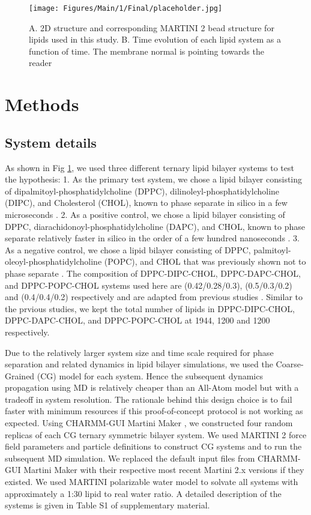 \documentclass{biophys-new}
\begin{document}
\begin{figure}[hbt!]
\centering
\texttt{[image: Figures/Main/1/Final/placeholder.jpg]}
\caption{A. 2D structure and corresponding MARTINI 2 bead structure for lipids used in this study. B. Time evolution of each lipid system as a function of time. The membrane normal is pointing towards the reader}
\label{fig1:view}
\end{figure}

\section*{Methods}

\subsection*{System details}

As shown in Fig \ref{fig1:view}, we used three different ternary lipid bilayer systems to test the hypothesis:
1. As the primary test system, we chose a lipid bilayer consisting of dipalmitoyl-phosphatidylcholine (DPPC), dilinoleyl-phosphatidylcholine (DIPC), and Cholesterol (CHOL), known to phase separate in silico in a few microseconds \cite{Risselada2008, Schafer2010, Janosi2012, Doma2012, Jong2013, Liu2020, Su2020}.
2. As a positive control, we chose a lipid bilayer consisting of DPPC, diarachidonoyl-phosphatidylcholine (DAPC), and CHOL, known to phase separate relatively faster in silico in the order of a few hundred nanoseconds \cite{Lin2016, Lin2019, Davis2013a}.
3. As a negative control, we chose a lipid bilayer consisting of DPPC, palmitoyl-oleoyl-phosphatidylcholine (POPC), and CHOL that was previously shown not to phase separate \cite{Veatch2003,Davis2013a}.
The composition of DPPC-DIPC-CHOL, DPPC-DAPC-CHOL, and DPPC-POPC-CHOL systems used here are (0.42/0.28/0.3), (0.5/0.3/0.2) and (0.4/0.4/0.2) respectively and are adapted from previous studies \cite{Risselada2008, Lin2016, Davis2013a}.
Similar to the prvious studies, we kept the total number of lipids in DPPC-DIPC-CHOL, DPPC-DAPC-CHOL, and DPPC-POPC-CHOL at 1944, 1200 and 1200 respectively.

Due to the relatively larger system size and time scale required for phase separation and related dynamics in lipid bilayer simulations, we used the Coarse-Grained (CG) model for each system. Hence the subsequent dynamics propagation using MD is relatively cheaper than an All-Atom model but with a tradeoff in system resolution.
The rationale behind this design choice is to fail faster with minimum resources if this proof-of-concept protocol is not working as expected. 
Using CHARMM-GUI Martini Maker \cite{Qi2015}, we constructed four random replicas of each CG ternary symmetric bilayer system.
We used MARTINI 2 force field parameters and particle definitions\cite{Marrink2007, DeJong2013} to construct CG systems and to run the subsequent MD simulation.
We replaced the default input files from CHARMM-GUI Martini Maker with their respective most recent Martini 2.x versions if they existed.
We used MARTINI polarizable water model\cite{Yesylevskyy2010} to solvate all systems with approximately a 1:30 lipid to real water ratio.
A detailed description of the systems is given in Table S1 of supplementary material.
\end{document}
